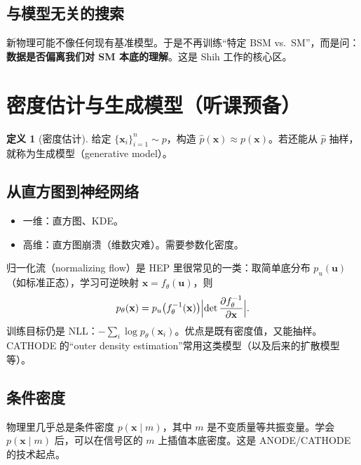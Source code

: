 \documentclass[11pt,a4paper]{article}
\theoremstyle{definition}
\newtheorem{definition}{定义}[section]
\theoremstyle{plain}
\theoremstyle{remark}
\begin{document}
\subsection{与模型无关的搜索}

新物理可能不像任何现有基准模型。于是不再训练``特定 BSM vs.\ SM''，而是问：\textbf{数据是否偏离我们对 SM 本底的理解}。这是 Shih 工作的核心区。

\section{密度估计与生成模型（听课预备）}
\label{sec:density}

\begin{definition}[密度估计]
给定 $\{\mathbf{x}_i\}_{i=1}^n\sim p$，构造 $\hat p(\mathbf{x})\approx p(\mathbf{x})$。若还能从 $\hat p$ 抽样，就称为生成模型（generative model）。
\end{definition}

\subsection{从直方图到神经网络}

\begin{itemize}[leftmargin=1.4em]
  \item 一维：直方图、KDE。
  \item 高维：直方图崩溃（维数灾难）。需要参数化密度。
\end{itemize}

归一化流（normalizing flow）是 HEP 里很常见的一类：取简单底分布 $p_u(\mathbf{u})$（如标准正态），学习可逆映射 $\mathbf{x}=f_\theta(\mathbf{u})$，则
\begin{equation}
\label{eq:flow}
  p_\theta(\mathbf{x})=p_u\bigl(f_\theta^{-1}(\mathbf{x})\bigr)
  \Bigl|\det\frac{\partial f_\theta^{-1}}{\partial\mathbf{x}}\Bigr|.
\end{equation}
训练目标仍是 NLL：$-\sum_i\log p_\theta(\mathbf{x}_i)$。优点是既有密度值，又能抽样。CATHODE 的``outer density estimation''常用这类模型（以及后来的扩散模型等）。

\subsection{条件密度}

物理里几乎总是条件密度 $p(\mathbf{x}\mid m)$，其中 $m$ 是不变质量等共振变量。学会 $p(\mathbf{x}\mid m)$ 后，可以在信号区的 $m$ 上插值本底密度。这是 ANODE/CATHODE 的技术起点。
\end{document}
